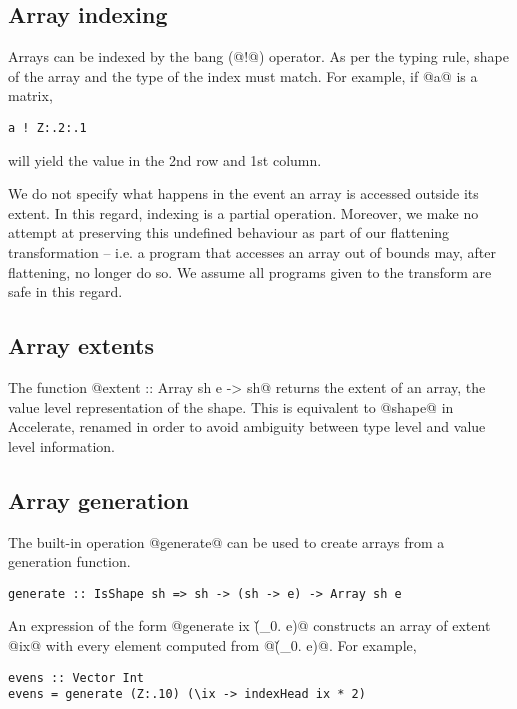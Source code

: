 
\subsection{Array indexing}

Arrays can be indexed by the bang (@!@) operator. As per the typing rule, shape of the array and the type of the index must match. For example, if @a@ is a matrix,
%
\begin{lstlisting}
a ! Z:.2:.1
\end{lstlisting}
%
will yield the value in the 2nd row and 1st column.

We do not specify what happens in the event an array is accessed outside its extent. In this regard, indexing is a partial operation. Moreover, we make no attempt at preserving this undefined behaviour as part of our flattening transformation -- i.e. a program that accesses an array out of bounds may, after flattening, no longer do so. We assume all programs given to the transform are safe in this regard.

\subsection{Array extents}
The function @extent :: Array sh e -> sh@ returns the extent of an array, the value level representation of the shape. This is equivalent to @shape@ in Accelerate, renamed in order to avoid ambiguity between type level and value level information.

\subsection{Array generation}
The built-in operation @generate@ can be used to create arrays from a generation function.
%
\begin{lstlisting}
generate :: IsShape sh => sh -> (sh -> e) -> Array sh e
\end{lstlisting}
%
An expression of the form @generate ix (\v_0. e)@ constructs an array of extent @ix@ with every element computed from @(\v_0. e)@. For example,
%
\begin{lstlisting}
evens :: Vector Int
evens = generate (Z:.10) (\ix -> indexHead ix * 2)
\end{lstlisting}

